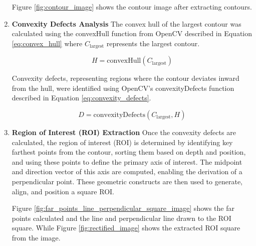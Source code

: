 \begin{enumerate}
    Figure \ref{fig:contour_image} shows the contour image after extracting contours.

    \item \textbf{Convexity Defects Analysis}
    The convex hull of the largest contour was calculated using the convexHull function from OpenCV described in Equation \ref{eq:convex_hull} where \( C_{\text{largest}} \) represents the largest contour.
    
    \begin{equation}
        H = \text{convexHull}(C_{\text{largest}})
        \label{eq:convex_hull}
    \end{equation}

    Convexity defects, representing regions where the contour deviates inward from the hull, were identified using OpenCV's convexityDefects function described in Equation \ref{eq:convexity_defects}.

    \begin{equation}
        D = \text{convexityDefects}(C_{\text{largest}}, H)
        \label{eq:convexity_defects}
    \end{equation}

    \item \textbf{Region of Interest (ROI) Extraction} 
    Once the convexity defects are calculated, the region of interest (ROI) is determined by identifying key farthest points from the contour, sorting them based on depth and position, and using these points to define the primary axis of interest. The midpoint and direction vector of this axis are computed, enabling the derivation of a perpendicular point. These geometric constructs are then used to generate, align, and position a square ROI.

    Figure \ref{fig:far_points_line_perpendicular_square_image} shows the far points calculated and the line and perpendicular line drawn to the ROI square. While Figure \ref{fig:rectified_image} shows the extracted ROI square from the image.


\end{enumerate}
